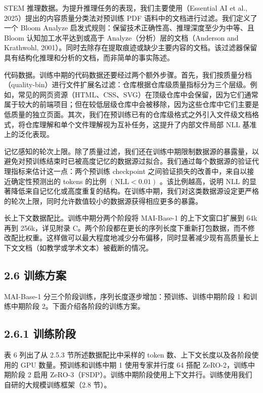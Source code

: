 STEM 推理数据。为提升推理任务的表现，我们主要使用（Essential AI et al., 2025）提出的内容质量分类法对预训练 PDF 语料中的文档进行过滤。我们定义了一个 Bloom Analyze 启发式规则：保留技术正确性高、推理深度至少为中等、且 Bloom 认知加工水平达到或高于 Analyze（分析）层的文档（Anderson and Krathwohl, 2001）。同时去除存在提取痕迹或缺少主要内容的文档。该过滤器保留具有结构化推理和分析的文档，而非简单的事实陈述。

代码数据。训练中期的代码数据还要经过两个额外步骤。首先，我们按质量分档（quality-bin）进行文件扩展名过滤：仓库根据仓库级质量指标分为三个层级。例如，常见的网页资源（HTML、CSS、SVG）在顶级仓库中会保留，因为它们通常属于较大的前端项目；但在较低层级仓库中会被移除，因为这些仓库中它们主要是低质量的独立页面。其次，我们在预训练已有的仓库级格式之外引入文件级文档格式，将仓库理解和单个文件理解视为互补任务，这提升了内部文件局部 NLL 基准上的泛化表现。

记忆感知的轮次上限。除了质量过滤，我们还在训练中期限制数据源的暴露量，以避免对预训练结束时已被高度记忆的数据源过拟合。我们通过每个数据源的验证代理指标来估计这一点：两个预训练 checkpoint 之间验证损失的改善中，来自以接近确定性预测出的 tokens 的比例
\(\left( \mathrm { N L L } < 0 . 0 1 \right)\) 。该比例越高，说明 NLL 的显著降低来自记忆化或高度重复的结构。在训练中期，我们对这类数据源设定更严格的轮次上限，同时允许数值较小的数据源获得相应更多的暴露。

长上下文数据配比。训练中期分两个阶段将 MAI-Base-1 的上下文窗口扩展到 64k 再到 256k，详见附录 C。两个阶段都在更长的序列长度下重新打包数据，而不修改配比权重。这样做可以最大程度地减少分布偏移，同时显著减少现有高质量长上下文文档（如教学或学术文本）被截断的情况。

\subsection{2.6 训练方案}\label{training-recipe}

MAI-Base-1 分三个阶段训练，序列长度逐步增加：预训练、训练中期阶段 1 和训练中期阶段 2。下面介绍各阶段的训练方案。

\subsection{2.6.1 训练阶段}\label{training-phases}

表 6 列出了从 2.5.3 节所述数据配比中采样的 token 数、上下文长度以及各阶段使用的 GPU 数量。预训练和训练中期 1 使用专家并行度 64 搭配 ZeRO-2，训练中期阶段 2 启用 ZeRO-3（FSDP）。训练中期阶段使用上下文并行。训练使用我们自研的大规模训练框架（2.8 节）。

